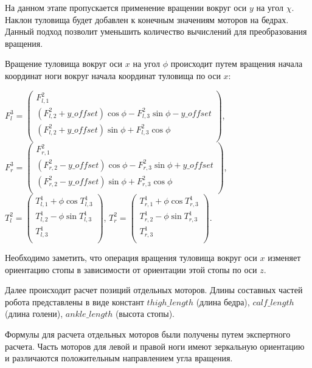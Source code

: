 На данном этапе пропускается применение вращении вокруг оси $y$ на угол $\chi$. Наклон туловища будет добавлен к конечным значениям моторов на бедрах. Данный подход позволит уменьшить количество вычислений для преобразования вращения.

Вращение туловища вокруг оси $x$ на угол $\phi$ происходит путем вращения начала координат ноги вокруг начала координат туловища по оси $x$:

\begin{center}
$F^{3}_{l} = \begin{pmatrix}
F^{2}_{l,1} \\
(F^{2}_{l,2} + y\_offset) \cos \phi - F^{2}_{l,3} \sin \phi - y\_offset \\
(F^{2}_{l,2} + y\_offset) \sin \phi + F^{2}_{l,3} \cos \phi \\
\end{pmatrix}$, $F^{3}_{r} = \begin{pmatrix}
F^{2}_{r,1} \\
(F^{2}_{r,2} - y\_offset) \cos \phi - F^{2}_{r,3} \sin \phi + y\_offset \\
(F^{2}_{r,2} - y\_offset) \sin \phi + F^{2}_{r,3} \cos \phi \\
\end{pmatrix}$,\\
$T^{2}_{l} = \begin{pmatrix}
T^{1}_{l,1} + \phi \cos T^{1}_{l,3} \\
T^{1}_{l,2} - \phi \sin T^{1}_{l,3} \\
T^{1}_{l,3} \\
\end{pmatrix}$,
$T^{2}_{r} = \begin{pmatrix}
T^{1}_{r,1} + \phi \cos T^{1}_{r,3}  \\
T^{1}_{r,2} - \phi \sin T^{1}_{r,3}  \\
T^{1}_{r,3} \\
\end{pmatrix}$.
\end{center}

Необходимо заметить, что операция вращения туловища вокруг оси $x$ изменяет ориентацию стопы в зависимости от ориентации этой стопы по оси $z$.

Далее происходит расчет позиций отдельных моторов. Длины составных частей робота представлены в виде констант $thigh\_length$ (длина бедра), $calf\_length$ (длина голени), $ankle\_length$ (высота стопы).

Формулы для расчета отдельных моторов были получены путем экспертного расчета. Часть моторов для левой и правой ноги имеют зеркальную ориентацию и различаются положительным направлением угла вращения.

